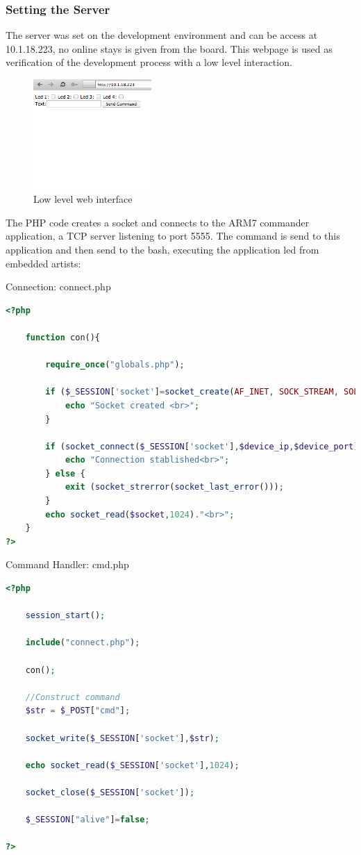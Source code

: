\subsubsection{Setting the Server}
The server was set on the development environment and can be access at 10.1.18.223, no online stays is given from the board. This webpage is used as verification of the development process with a low level interaction. 
\begin{figure}[H]
	\begin{centering}
		 \includegraphics[width=0.4\textwidth,page=1]{images/website.png}
		\caption{Low level web interface}
	\end{centering}
\end{figure}

The PHP code creates a socket and connects to the ARM7 commander application, a TCP server listening to port 5555. The command is send to this application and then send to the bash, executing the application led from embedded artists:

Connection: connect.php

\begin{lstlisting}[language=php]
<?php
	
	function con(){
	
		require_once("globals.php");
		
		if ($_SESSION['socket']=socket_create(AF_INET, SOCK_STREAM, SOL_TCP)){
			echo "Socket created <br>";
		}
	
		if (socket_connect($_SESSION['socket'],$device_ip,$device_port)){
			echo "Connection stablished<br>";	
		} else {
			exit (socket_strerror(socket_last_error()));
		}
		echo socket_read($socket,1024)."<br>";	
	}    
?>
\end{lstlisting}

Command Handler: cmd.php

\begin{lstlisting}[language=php]
<?php
	
	session_start();
	
	include("connect.php");
	
	con();
		
	//Construct command
	$str = $_POST["cmd"];
	
	socket_write($_SESSION['socket'],$str);
	
	echo socket_read($_SESSION['socket'],1024);
	
	socket_close($_SESSION['socket']);
	
	$_SESSION["alive"]=false;

?>
\end{lstlisting}

